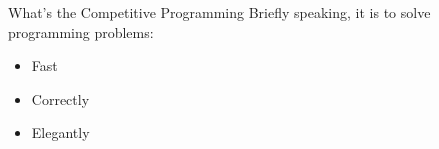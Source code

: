 \begin{frame}{What's the Competitive Programming}
Briefly speaking, it is to solve programming problems:
\begin{itemize}
  \item<2-> Fast
  \item<3-> Correctly
  \item<4-> Elegantly
\end{itemize}
\end{frame}
